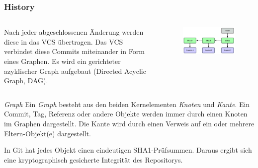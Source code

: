 \documentclass{beamer}
\begin{document}
\begin{frame}\frametitle{History}
\begin{columns}
Nach jeder abgeschlossenen Änderung werden diese in das VCS übertragen. Das VCS verbindet diese Commits miteinander in Form eines Graphen. Es wird ein gerichteter azyklischer Graph aufgebaut (Directed Acyclic Graph, DAG). 
		\begin{figure}
		\includegraphics[scale=0.30]{Bilder/graph} 
\end{figure}
\end{columns}

\begin{block}{\textit{Graph}}
Ein \textit{Graph} besteht aus den beiden Kernelementen \textit{Knoten} und \textit{Kante}. Ein Commit, Tag, Referenz oder andere Objekte werden immer durch einen Knoten im Graphen dargestellt. Die Kante wird durch einen Verweis auf ein oder mehrere Eltern-Objekt(e) dargestellt. 
\end{block}

In Git hat jedes Objekt einen eindeutigen SHA1-Prüfsummen. Daraus ergibt sich eine kryptographisch gesicherte Integrität des Repositorys. 

\end{frame}
\end{document}
